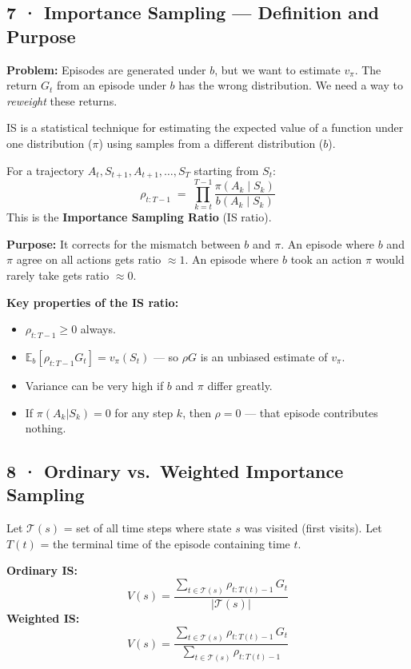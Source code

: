 \documentclass[11pt,a4paper]{article}
\begin{document}
\subsection*{7 · Importance Sampling — Definition and Purpose}

\textbf{Problem:} Episodes are generated under $b$, but we want to estimate $v_\pi$.
The return $G_t$ from an episode under $b$ has the wrong distribution.
We need a way to \emph{reweight} these returns.

\begin{tcolorbox}[bold={Importance Sampling (IS)}]
IS is a statistical technique for estimating the expected value of a function under one
distribution ($\pi$) using samples from a different distribution ($b$).

\medskip
For a trajectory $A_t, S_{t+1}, A_{t+1}, \ldots, S_T$ starting from $S_t$:
\[
  \rho_{t:T-1} \;=\; \prod_{k=t}^{T-1} \frac{\pi(A_k \mid S_k)}{b(A_k \mid S_k)}
\]
This is the \textbf{Importance Sampling Ratio} (IS ratio).

\medskip
\textbf{Purpose:} It corrects for the mismatch between $b$ and $\pi$.
An episode where $b$ and $\pi$ agree on all actions gets ratio $\approx 1$.
An episode where $b$ took an action $\pi$ would rarely take gets ratio $\approx 0$.
\end{tcolorbox}

\textbf{Key properties of the IS ratio:}
\begin{itemize}
  \item $\rho_{t:T-1} \geq 0$ always.
  \item $\mathbb{E}_b[\rho_{t:T-1} G_t] = v_\pi(S_t)$ — so $\rho G$ is an unbiased estimate of $v_\pi$.
  \item Variance can be very high if $b$ and $\pi$ differ greatly.
  \item If $\pi(A_k|S_k) = 0$ for any step $k$, then $\rho = 0$ — that episode contributes nothing.
\end{itemize}

\subsection*{8 · Ordinary vs.\ Weighted Importance Sampling}

Let $\mathcal{T}(s)$ = set of all time steps where state $s$ was visited (first visits).
Let $T(t)$ = the terminal time of the episode containing time $t$.

\begin{tcolorbox}[defn={Two IS Estimators}]
\textbf{Ordinary IS:}
\[
  V(s) = \frac{\displaystyle\sum_{t \in \mathcal{T}(s)} \rho_{t:T(t)-1}\, G_t}
              {|\mathcal{T}(s)|}
\]
\textbf{Weighted IS:}
\[
  V(s) = \frac{\displaystyle\sum_{t \in \mathcal{T}(s)} \rho_{t:T(t)-1}\, G_t}
              {\displaystyle\sum_{t \in \mathcal{T}(s)} \rho_{t:T(t)-1}}
\]
\end{tcolorbox}
\end{document}
